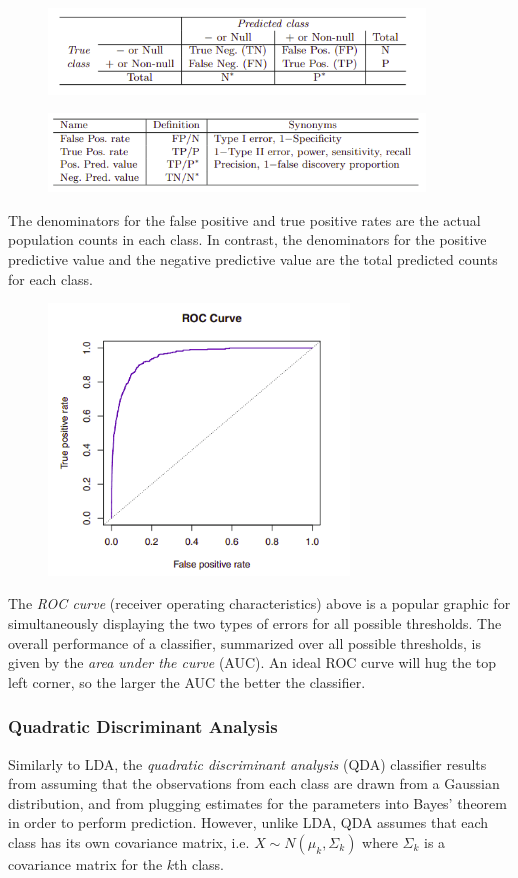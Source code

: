 \documentclass{article}
\numberwithin{equation}{section}
\begin{document}
\begin{enumerate}
\begin{figure}[H]
    \centering
    \includegraphics[width=10cm]{classifier-names.png}
\end{figure}
\begin{figure}[H]
    \centering
\includegraphics[width=10cm]{classifier-measures.png}
\end{figure}
The denominators for the false positive and true positive rates
are the actual population counts in each class. In contrast, the denominators for the positive predictive value and the negative predictive value are the total predicted counts for each class.
\begin{figure}[H]
    \centering
    \includegraphics[width=8cm]{roc-curve.png}
\end{figure}
The \textit{ROC curve} (receiver operating characteristics) above is a popular graphic for simultaneously displaying the two types of errors for all possible thresholds. The overall performance of a classifier, summarized over all possible thresholds, is given by the \textit{area under the curve} (AUC). An ideal ROC curve will hug the top left corner, so the larger the AUC the better the classifier.

\subsubsection{Quadratic Discriminant Analysis}
Similarly to LDA, the \textit{quadratic discriminant analysis} (QDA) classifier results from assuming that the observations from each class are drawn from a Gaussian distribution, and from plugging estimates for the parameters into Bayes’ theorem in order to perform prediction.  However, unlike LDA, QDA assumes that each class has its own covariance matrix, i.e. $X \sim N(\mu_k, \Sigma_k)$ where $\Sigma_k$ is a covariance matrix for the $k$th class.


\end{enumerate}
\end{document}
